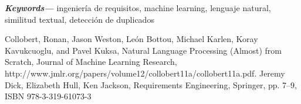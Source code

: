 \documentclass[a4paper]{article}
\providecommand{\keywords}[1]
{
  \small	
  \textbf{\textit{Keywords---}} #1
}
\begin{document}
\keywords{ingeniería de requisitos, machine learning, lenguaje natural, similitud textual, detección de duplicados}
\begin{thebibliography}{00}
 Collobert, Ronan, Jason Weston, León Bottou, Michael Karlen, Koray Kavukcuoglu, and Pavel Kuksa, Natural Language Processing (Almost) from Scratch, Journal of Machine Learning Research, http://www.jmlr.org/papers/volume12/collobert11a/collobert11a.pdf.
 Jeremy Dick, Elizabeth Hull, Ken Jackson, Requirements Engineering, Springer, pp. 7–9, ISBN 978-3-319-61073-3
\end{thebibliography}


\end{document}
